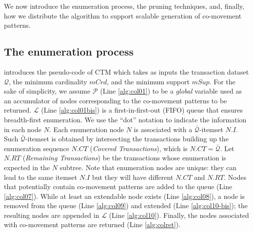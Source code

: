 \documentclass[preprint,12pt,authoryear]{elsarticle} %
\begin{document}
We now introduce the enumeration process, the pruning techniques, and, finally, how we distribute the algorithm to support scalable generation of co-movement patterns.

\subsection{The enumeration process}
 introduces the pseudo-code of CTM which takes as inputs the transaction dataset $\mathcal{Q}$, the minimum cardinality $mCrd$, and the minimum support $mSup$.
For the sake of simplicity, we assume $\mathcal{P}$ (Line \ref{alg:col01}) to be a \textit{global} variable used as an accumulator of nodes corresponding to the co-movement patterns to be returned.
$\mathcal{L}$ (Line \ref{alg:col01bis}) is a first-in-first-out (FIFO) queue that ensures breadth-first enumeration.
We use the ``dot'' notation to indicate the information in each node $N$.
Each enumeration node $N$ is associated with a $\bar{\mathcal{Q}}$-itemset $N.I$.
Such $\bar{\mathcal{Q}}$-itemset is obtained by intersecting the transactions building up the enumeration sequence $N.CT$ (\textit{Covered Transactions}), which is $N.CT=\bar{\mathcal{Q}}$.
Let $ N.RT $ (\textit{Remaining Transactions}) be the transactions whose enumeration is expected in the $N$ subtree.
Note that enumeration nodes are unique: they can lead to the same itemset $N.I$ but they will have different $N.CT$ and $N.RT$.
Nodes that potentially contain co-movement patterns are added to the queue (Line \ref{alg:col07}).
While at least an extendable node exists (Line \ref{alg:col08}), a node is removed from the queue (Line \ref{alg:col09}) and extended (Line \ref{alg:col10-bis}); the resulting nodes are appended in $\mathcal{L}$ (Line \ref{alg:col10}).
Finally, the nodes associated with co-movement patterns are returned (Line \ref{alg:colret}).
\end{document}
